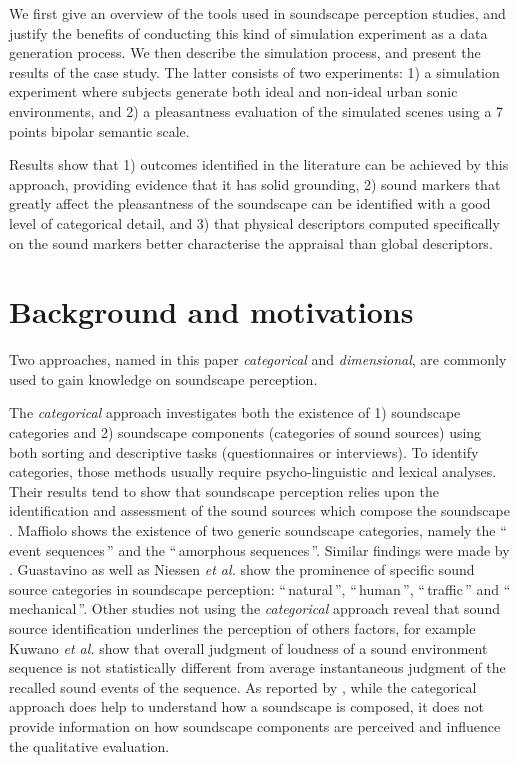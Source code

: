 \documentclass[twoside,twocolumn]{article}
\begin{document}
We first give an overview of the tools used in soundscape perception studies, and justify the benefits of conducting this kind of simulation experiment as a data generation process. We then describe the simulation process, and present the results of the case study. The latter consists of two experiments: 1) a simulation experiment where subjects generate both ideal and non-ideal urban sonic environments, and 2) a pleasantness evaluation of the simulated scenes using a 7 points bipolar semantic scale.

Results show that 1) outcomes identified in the literature \cite{guastavino_categorization_2007} can be achieved by this approach, providing evidence that it has solid grounding, 2) sound markers that greatly affect the pleasantness of the soundscape can be identified with a good level of categorical detail, and 3) that physical descriptors computed specifically on the sound markers better characterise the appraisal than global descriptors.


\section{Background and motivations}
\label{statoftheart}

Two approaches, named in this paper \textit{categorical} and \textit{dimensional}, are commonly used to gain knowledge on soundscape perception.

The \textit{categorical} approach investigates both the existence of 1) soundscape categories and 2) soundscape components (categories of sound sources) using both sorting \cite{maffiolo_caracterisation_1999, guastavino_categorization_2007} and descriptive \cite{axelsson2005soundscape, raimbault_urban_2005, raimbault2006qualitative, guastavino_ideal_2006} tasks (questionnaires or interviews). To identify categories, those methods usually require psycho-linguistic and lexical analyses. Their results tend to show that soundscape perception relies upon the identification and assessment of the sound sources which compose the soundscape \cite{dubois2006cognitive}. Maffiolo \cite{maffiolo_caracterisation_1999} shows the existence of two generic soundscape categories, namely the ``\,event sequences\,'' and the ``\,amorphous sequences\,''. Similar findings were made by \cite{guastavino_ideal_2006}. Guastavino \cite{guastavino_categorization_2007} as well as Niessen \emph{et al.} \cite{niessen_categories_2010}  show the prominence of specific sound source categories in soundscape perception: ``\,natural\,'', ``\,human\,'', ``\,traffic\,'' and ``\,mechanical\,''. Other studies not using the \textit{categorical} approach reveal that sound source identification underlines the perception of others factors, for example Kuwano \emph{et al.} \cite{kuwano_memory_2003-1} show that overall judgment of loudness of a sound environment sequence is not statistically different from average instantaneous judgment of the recalled sound events of the sequence.  As reported by \cite{davies_perception_2013}, while the categorical approach does help to understand how a soundscape is composed, it does not provide information on how soundscape components are perceived and influence the qualitative evaluation.
\end{document}
